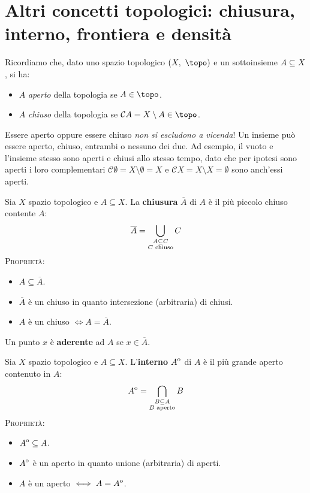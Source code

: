 \section{Altri concetti topologici: chiusura, interno, frontiera e densità}
Ricordiamo che, dato uno spazio topologico $\left(X,\ \topo\right)$ e un sottoinsieme $A\subseteq X$, si ha:
\begin{itemize}
\item $A$ \textit{aperto} della topologia se $A\in\topo$.
\item $A$ \textit{chiuso} della topologia se $\mathcal{C}A=X\setminus A\in\topo$.
\end{itemize}
\begin{attention}
Essere aperto oppure essere chiuso \textit{non si escludono a vicenda}! Un insieme può essere aperto, chiuso, entrambi o nessuno dei due. Ad esempio, il vuoto e l'insieme stesso sono aperti e chiusi allo stesso tempo, dato che per ipotesi sono aperti i loro complementari $\mathcal{C}\emptyset = X\setminus \emptyset = X$ e $\mathcal{C}X = X\setminus X = \emptyset$ sono anch'essi aperti.
\end{attention}
\begin{define}
Sia $X$ spazio topologico e $A\subseteq X$. La \textbf{chiusura} $\overline{A}$ di $A$ è il più piccolo chiuso contente $A$:
\begin{equation}
\overline{A}=\mathop{{\bigcup}}\displaylimits_{\substack{A\subseteq C\\ C\text{ chiuso}}}C
\end{equation}
\textsc{Proprietà:}
\begin{itemize}
\item $A\subseteq \overline{A}$.
\item $\overline{A}$ è un chiuso in quanto intersezione (arbitraria) di chiusi.
\item $A$ è un chiuso $\iff A=\overline{A}$.
\end{itemize}
\end{define}
\begin{define}
Un punto $x$ è \textbf{aderente} ad $A$ se $x\in\overline{A}$.
\end{define}
\begin{define}
Sia $X$ spazio topologico e $A\subseteq X$. L'\textbf{interno} ${\kern0ptA}^{\mathrm{o}}$ di $A$ è il più grande aperto contenuto in $A$:
\begin{equation}
	{\kern0ptA}^{\mathrm{o}}=\mathop{{\bigcap}}\displaylimits_{\substack{B\subseteq A\\ B\text{ aperto}}}B
\end{equation}
\textsc{Proprietà:}
\begin{itemize}
	\item ${\kern0ptA}^{\mathrm{o}}\subseteq A$.
	\item ${\kern0ptA}^{\mathrm{o}}$ è un aperto in quanto unione (arbitraria) di aperti.
	\item $A$ è un aperto $\iff A={\kern0ptA}^{\mathrm{o}}$.
\end{itemize}
\end{define}
